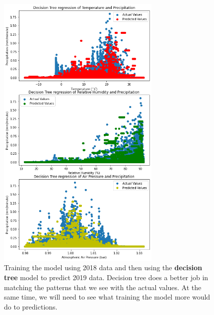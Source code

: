 \documentclass[11pt]{report}
\begin{document}
\begin{figure}[t]
	\centering
	\includegraphics[width=0.7\textwidth]{Figures/ML_DT_reg.png}
	\caption[ML Decision Tree regression run] {\label{ML_DT}Training the
          model using 2018 data and then using the \textbf{decision tree}
          model to predict 2019 data. Decision tree does a better job in
          matching the patterns that we see with the actual values. At the
          same time, we will need to see what training the model more would
          do to predictions.}
\end{figure}
\end{document}
